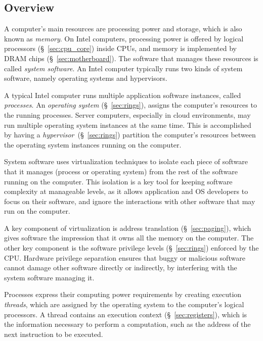 \subsection{Overview}
\label{sec:background_overview}

A computer's main resources are processing power and storage, which is also
known as \textit{memory}. On Intel computers, processing power is offered by
logical processors (\S~\ref{sec:cpu_core}) inside CPUs, and memory is
implemented by DRAM chips (\S~\ref{sec:motherboard}). The software that manages
these resources is called \textit{system software}. An Intel computer typically
runs two kinds of system software, namely operating systems and hypervisors.

A typical Intel computer runs multiple application software instances, called
\textit{processes}. An \textit{operating system} (\S~\ref{sec:rings}), assigns
the computer's resources to the running processes. Server computers, especially
in cloud environments, may run multiple operating system instances at the same
time. This is accomplished by having a \textit{hypervisor}~(\S~\ref{sec:rings})
partition the computer's resources between the operating system instances
running on the computer.

System software uses virtualization techniques to isolate each piece of
software that it manages (process or operating system) from the rest of the
software running on the computer. This isolation is a key tool for keeping
software complexity at manageable levels, as it allows application and OS
developers to focus on their software, and ignore the interactions with other
software that may run on the computer.

A key component of virtualization is address translation (\S~\ref{sec:paging}),
which gives software the impression that it owns all the memory on the
computer. The other key component is the software privilege levels
(\S~\ref{sec:rings}) enforced by the CPU. Hardware privilege separation ensures
that buggy or malicious software cannot damage other software directly or
indirectly, by interfering with the system software managing it.

Processes express their computing power requirements by creating execution
\textit{threads}, which are assigned by the operating system to the computer's
logical processors. A thread contains an execution context
(\S~\ref{sec:registers}), which is the information necessary to perform a
computation, such as the address of the next instruction to be executed.


